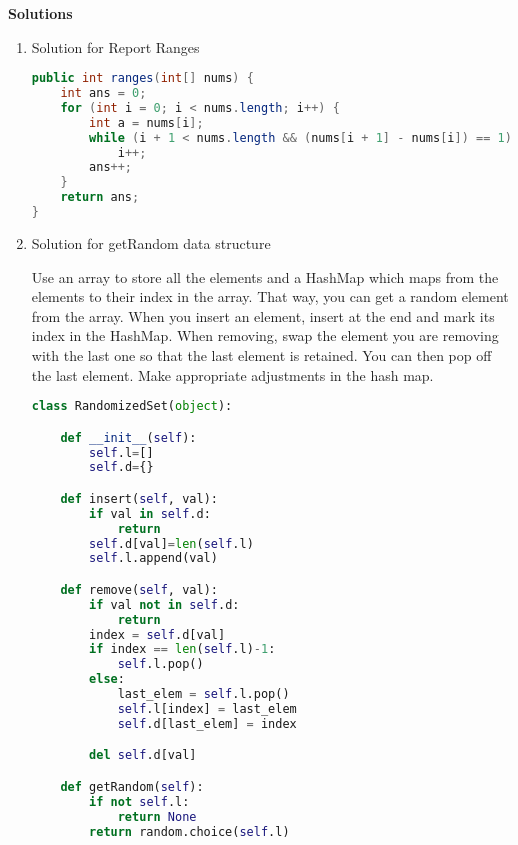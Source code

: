 \documentclass{article}
\begin{document}
\clearpage




\begin{center}
    \textbf{Solutions}
\end{center}

\begin{enumerate}



\item Solution for Report Ranges

\begin{lstlisting}[language=Java]
public int ranges(int[] nums) {
    int ans = 0;
    for (int i = 0; i < nums.length; i++) {
        int a = nums[i];
        while (i + 1 < nums.length && (nums[i + 1] - nums[i]) == 1)
            i++;
        ans++;
    }
    return ans;
}
\end{lstlisting}

\item Solution for getRandom data structure

Use an array to store all the elements and a HashMap which maps from the elements to their index in the array. That way, you can get a random element from the array. When you insert an element, insert at the end and mark its index in the HashMap. When removing, swap the element you are removing with the last one so that the last element is retained. You can then pop off the last element. Make appropriate adjustments in the hash map.

\begin{lstlisting}[language=Python]
class RandomizedSet(object):

    def __init__(self):
        self.l=[]
        self.d={}

    def insert(self, val):
        if val in self.d:
            return
        self.d[val]=len(self.l)
        self.l.append(val)

    def remove(self, val):
        if val not in self.d:
            return
        index = self.d[val]
        if index == len(self.l)-1:
            self.l.pop()
        else:
            last_elem = self.l.pop()
            self.l[index] = last_elem
            self.d[last_elem] = index

        del self.d[val]

    def getRandom(self):
        if not self.l:
            return None
        return random.choice(self.l)

\end{lstlisting}


\end{enumerate}
\end{document}
